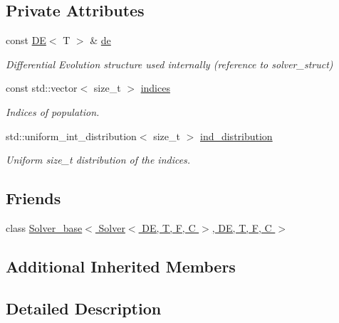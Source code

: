 \subsection*{Private Attributes}
\begin{DoxyCompactItemize}
\item 
const \hyperlink{structea_1_1_d_e}{DE}$<$ T $>$ \& \hyperlink{classea_1_1_solver_3_01_d_e_00_01_t_00_01_f_00_01_c_01_4_a789b8665ce321248e3999907c37d0963}{de}
\begin{DoxyCompactList}\small\item\em Differential Evolution structure used internally (reference to solver\+\_\+struct) \end{DoxyCompactList}\item 
const std\+::vector$<$ size\+\_\+t $>$ \hyperlink{classea_1_1_solver_3_01_d_e_00_01_t_00_01_f_00_01_c_01_4_a8428ecceaab1c7e26715ed2f72654693}{indices}
\begin{DoxyCompactList}\small\item\em Indices of population. \end{DoxyCompactList}\item 
std\+::uniform\+\_\+int\+\_\+distribution$<$ size\+\_\+t $>$ \hyperlink{classea_1_1_solver_3_01_d_e_00_01_t_00_01_f_00_01_c_01_4_a2f762378d566944899b2a07a5c74fc7f}{ind\+\_\+distribution}
\begin{DoxyCompactList}\small\item\em Uniform size\+\_\+t distribution of the indices. \end{DoxyCompactList}\end{DoxyCompactItemize}
\subsection*{Friends}
\begin{DoxyCompactItemize}
\item 
class \hyperlink{classea_1_1_solver_3_01_d_e_00_01_t_00_01_f_00_01_c_01_4_af331e622818a725800b24cd03d46f3f1}{Solver\+\_\+base$<$ Solver$<$ D\+E, T, F, C $>$, D\+E, T, F, C $>$}
\end{DoxyCompactItemize}
\subsection*{Additional Inherited Members}


\subsection{Detailed Description}
